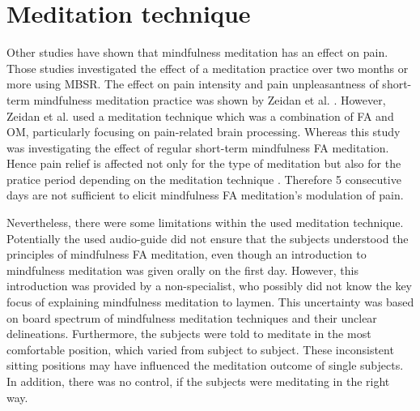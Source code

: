 



\section{Meditation technique}
Other studies have shown that mindfulness meditation has an effect on pain. Those studies investigated the effect of a meditation practice over two months or more using MBSR. \cite{Kabat1982,Rosenzweig2010} The effect on pain intensity and pain unpleasantness of short-term mindfulness meditation practice was shown by Zeidan et al. \cite{Zeidan2012}. However, Zeidan et al. \cite{Zeidan2012} used a meditation technique which was a combination of FA and OM, particularly focusing on pain-related brain processing. Whereas this study was investigating the effect of regular short-term mindfulness FA meditation. Hence pain relief is affected not only for the type of meditation but also for the pratice period depending on the meditation technique . Therefore 5 consecutive days are not sufficient to elicit mindfulness FA meditation’s modulation of pain.




Nevertheless, there were some limitations within the used meditation technique. Potentially the used audio-guide did not ensure that the subjects understood the principles of mindfulness FA meditation, even though an introduction to mindfulness meditation was given orally on the first day. However, this introduction was provided by a non-specialist, who possibly did not know the key focus of explaining mindfulness meditation to laymen. This uncertainty was based on board spectrum of mindfulness meditation techniques and their unclear delineations. 
Furthermore, the subjects were told to meditate in the most comfortable position, which varied from subject to subject. These inconsistent sitting positions may have influenced the meditation outcome of single subjects. In addition, there was no control, if the subjects were meditating in the right way.
